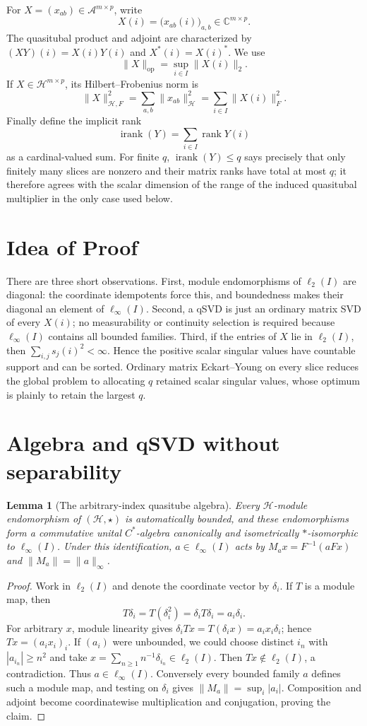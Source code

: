 \documentclass[11pt]{article}
\newtheorem{lemma}[theorem]{Lemma}
\newcommand{\A}{\mathcal A}
\newcommand{\Hh}{\mathcal H}
\newcommand{\rank}{\operatorname{rank}}
\newcommand{\irank}{\operatorname{irank}}
\begin{document}
For $X=(x_{ab})\in\A^{m\times p}$, write
\[
 X(i)=\bigl(x_{ab}(i)\bigr)_{a,b}\in\mathbb C^{m\times p}.
\]
The quasitubal product and adjoint are characterized by
$(XY)(i)=X(i)Y(i)$ and $X^*(i)=X(i)^*$.  We use
\[
 \|X\|_{\mathrm{op}}=\sup_{i\in I}\|X(i)\|_2.
\]
If $X\in\Hh^{m\times p}$, its Hilbert--Frobenius norm is
\[
 \|X\|_{\Hh,F}^2
 =\sum_{a,b}\|x_{ab}\|_{\Hh}^2
 =\sum_{i\in I}\|X(i)\|_F^2.
\]
Finally define the implicit rank
\[
 \irank(Y)=\sum_{i\in I}\rank Y(i)
\]
as a cardinal-valued sum.  For finite $q$, $\irank(Y)\le q$ says precisely
that only finitely many slices are nonzero and their matrix ranks have total
at most $q$; it therefore agrees with the scalar dimension of the range of
the induced quasitubal multiplier in the only case used below.

\section{Idea of Proof}

There are three short observations.
First, module endomorphisms of $\ell_2(I)$ are diagonal: the coordinate
idempotents force this, and boundedness makes their diagonal an element of
$\ell_\infty(I)$.  Second, a qSVD is just an ordinary matrix SVD of every
$X(i)$; no measurability or continuity selection is required because
$\ell_\infty(I)$ contains all bounded families.  Third, if the entries of
$X$ lie in $\ell_2(I)$, then
$\sum_{i,j}s_j(i)^2<\infty$.  Hence the positive scalar singular values have
countable support and can be sorted.  Ordinary matrix Eckart--Young on every
slice reduces the global problem to allocating $q$ retained scalar singular
values, whose optimum is plainly to retain the largest $q$.

\section{Algebra and qSVD without separability}

\begin{lemma}[The arbitrary-index quasitube algebra]
Every $\Hh$-module endomorphism of $(\Hh,\star)$ is automatically bounded,
and these endomorphisms form a commutative
unital $C^*$-algebra canonically and isometrically $*$-isomorphic to
$\ell_\infty(I)$.  Under this identification, $a\in\ell_\infty(I)$ acts by
$M_a x=F^{-1}(aFx)$ and $\|M_a\|=\|a\|_\infty$.
\end{lemma}

\begin{proof}
Work in $\ell_2(I)$ and denote the coordinate vector by $\delta_i$.  If $T$
is a module map, then
\[
 T\delta_i=T(\delta_i^2)=\delta_iT\delta_i=a_i\delta_i.
\]
For arbitrary $x$, module linearity gives
$\delta_iTx=T(\delta_i x)=a_ix_i\delta_i$; hence $Tx=(a_ix_i)_i$.
If $(a_i)$ were unbounded, we could choose distinct $i_n$ with
$|a_{i_n}|\ge n^2$ and take $x=\sum_{n\ge1}n^{-1}\delta_{i_n}\in\ell_2(I)$.
Then $Tx\notin\ell_2(I)$, a contradiction.  Thus $a\in\ell_\infty(I)$.
Conversely every bounded family
$a$ defines such a module map, and testing on $\delta_i$ gives
$\|M_a\|=\sup_i|a_i|$.  Composition and adjoint become coordinatewise
multiplication and conjugation, proving the claim.
\end{proof}
\end{document}
